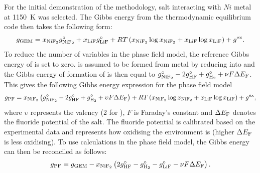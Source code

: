 For the initial demonstration of the methodology,  salt interacting with $Ni$ metal at \SI{1150}{\kelvin} was selected. The Gibbs energy from the thermodynamic equilibrium code then takes the following form:
\begin{equation*}
	g_\text{GEM} = x_{\ce{NiF2}} g_{\ce{NiF2}}^\circ + x_{\ce{LiF}} g_{\ce{LiF}}^\circ + RT\left( x_{\ce{NiF2}} \log{x_{\ce{NiF2}}} + x_{\ce{LiF}} \log{x_{\ce{LiF}}} \right) + g^\text{ex}.
\end{equation*}
To reduce the number of variables in the phase field model, the reference Gibbs energy of  is set to zero.  is assumed to be formed from  metal by reducing    into  and the Gibbs energy of formation of  is then equal to $g_{\ce{NiF2}}^\circ - 2 g_{\ce{HF}}^\circ + g_{\ce{H2}}^\circ + \nu F \Delta E_{\ce{F}}$. This gives the following Gibbs energy expression for the phase field model
\begin{equation*}
	g_\text{PF} = x_{\ce{NiF2}} \left( g_{\ce{NiF2}}^\circ - 2 g_{\ce{HF}}^\circ + g_{\ce{H2}}^\circ + \upsilon F \Delta E_{\ce{F}} \right) + RT\left( x_{\ce{NiF2}} \log{x_{\ce{NiF2}}} + x_{\ce{LiF}} \log{x_{\ce{LiF}}} \right) + g^\text{ex},
\end{equation*}
where $\upsilon$ represents the valency (2 for ), $F$ is Faraday's constant and $\Delta E_{\ce{F}}$ denotes the fluoride potential of the salt. The fluoride potential is calibrated based on the experimental data and represents how oxidising the environment is (higher $\Delta E_{\ce{F}}$ is less oxidising). To use {\GEM} calculations in the phase field model, the Gibbs energy can then be reconciled as follows:
\begin{equation*}
	g_\text{PF} = g_\text{GEM} - x_{\ce{NiF2}} \left( 2 g_{\ce{HF}}^\circ - g_{\ce{H2}}^\circ - g_{\ce{LiF}}^\circ - \nu F \Delta E_{\ce{F}} \right).
\end{equation*}

